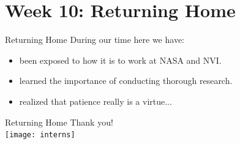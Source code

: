 \documentclass{beamer}
\begin{document}

    \section{Week 10: Returning Home}

    \begin{frame}{Returning Home}
        During our time here we have:
        \pause
        \begin{itemize}[<+-|alert@+>]
            \item been exposed to how it is to work at NASA and NVI.
            \item learned the importance of conducting thorough research.
            \item realized that patience really is a virtue...
        \end{itemize}
    \end{frame}

    \begin{frame}{Returning Home}
        \centering
        Thank you! \\ [2ex]
        \texttt{[image: interns]}
    \end{frame}
\end{document}
